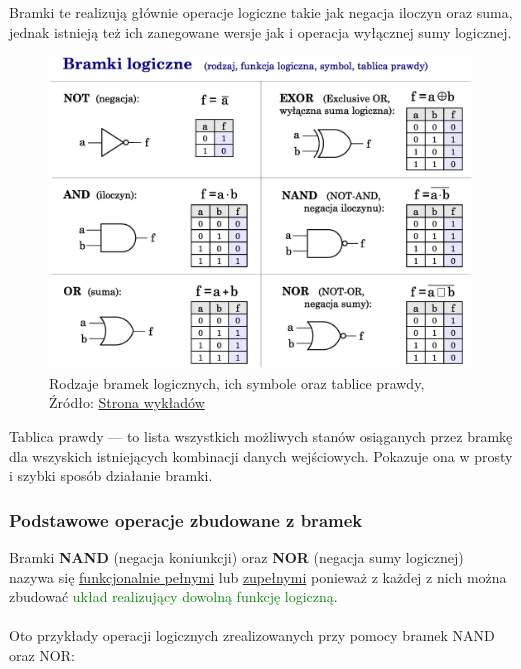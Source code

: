 \documentclass{article}
\begin{document}
      Bramki te realizują głównie operacje logiczne takie jak negacja iloczyn oraz suma, jednak istnieją też ich zanegowane wersje jak i operacja wyłącznej sumy logicznej.

      \begin{figure}[!ht]
        \centering
        \includegraphics[scale=0.35]{grafiki/Bramki_logiczne.eps}
        \caption{Rodzaje bramek logicznych, ich symbole oraz tablice prawdy,
        \\Źródło: \href{https://spe.if.uj.edu.pl/literatura}{Strona wykładów}}
        \label{fig2:brameczki}
      \end{figure}

      Tablica prawdy --- to lista wszystkich możliwych stanów osiąganych przez bramkę dla wszyskich istniejących kombinacji danych wejściowych. Pokazuje ona w prosty i szybki sposób działanie bramki.

      \subsubsection{Podstawowe operacje zbudowane z bramek}
        Bramki \textbf{NAND} (negacja koniunkcji) oraz \textbf{NOR} (negacja sumy logicznej) nazywa się \underline{funkcjonalnie pełnymi} lub \underline{zupełnymi} ponieważ z każdej z nich można zbudować \textcolor{green}{układ realizujący dowolną funkcję logiczną}.
        \\\\
        Oto przykłady operacji logicznych zrealizowanych przy pomocy bramek NAND oraz NOR:
\end{document}
